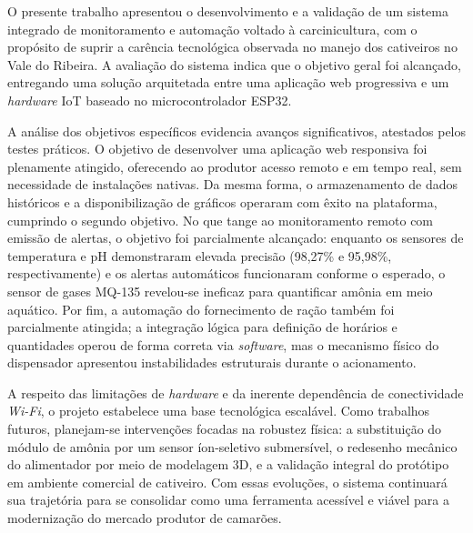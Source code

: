\documentclass[11pt,a4paper]{article}
\begin{document}
O presente trabalho apresentou o desenvolvimento e a validação de um sistema integrado de monitoramento e automação voltado à carcinicultura, com o propósito de suprir a carência tecnológica observada no manejo dos cativeiros no Vale do Ribeira. A avaliação do sistema indica que o objetivo geral foi alcançado, entregando uma solução arquitetada entre uma aplicação web progressiva e um \textit{hardware} IoT baseado no microcontrolador ESP32.

A análise dos objetivos específicos evidencia avanços significativos, atestados pelos testes práticos. O objetivo de desenvolver uma aplicação web responsiva foi plenamente atingido, oferecendo ao produtor acesso remoto e em tempo real, sem necessidade de instalações nativas. Da mesma forma, o armazenamento de dados históricos e a disponibilização de gráficos operaram com êxito na plataforma, cumprindo o segundo objetivo. No que tange ao monitoramento remoto com emissão de alertas, o objetivo foi parcialmente alcançado: enquanto os sensores de temperatura e pH demonstraram elevada precisão (98,27\% e 95,98\%, respectivamente) e os alertas automáticos funcionaram conforme o esperado, o sensor de gases MQ-135 revelou-se ineficaz para quantificar amônia em meio aquático. Por fim, a automação do fornecimento de ração também foi parcialmente atingida; a integração lógica para definição de horários e quantidades operou de forma correta via \textit{software}, mas o mecanismo físico do dispensador apresentou instabilidades estruturais durante o acionamento.

A respeito das limitações de \textit{hardware} e da inerente dependência de conectividade \textit{Wi-Fi}, o projeto estabelece uma base tecnológica escalável. Como trabalhos futuros, planejam-se intervenções focadas na robustez física: a substituição do módulo de amônia por um sensor íon-seletivo submersível, o redesenho mecânico do alimentador por meio de modelagem 3D, e a validação integral do protótipo em ambiente comercial de cativeiro. Com essas evoluções, o sistema continuará sua trajetória para se consolidar como uma ferramenta acessível e viável para a modernização do mercado produtor de camarões.



\end{document}

